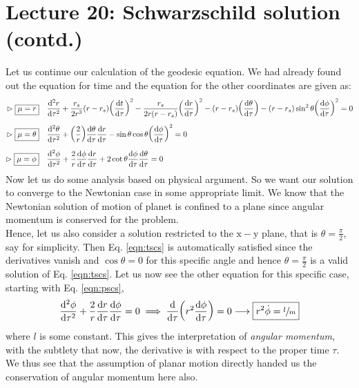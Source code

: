 \section*{Lecture 20: Schwarzschild solution (contd.)}
Let us continue our calculation of the geodesic equation. We had already found out the equation for time and the equation for the other coordinates are given as:
\begin{align}
    \vartriangleright \boxed{ \mu = r} \quad &\dv[2]{r}{\tau} + \frac{r_s}{2r^3}(r-r_s)\qty(\dv{t}{\tau})^2 - \frac{r_s}{2r(r-r_s)}\qty(\dv{r}{\tau})^2 -(r-r_s)\qty(\dv{\theta}{\tau}) - (r-r_s)\sin^2\theta\qty(\dv{\phi}{\tau})^2=0\label{eqn:rscs}\\[0.14cm]
\vartriangleright \boxed{ \mu = \theta} \quad &\dv[2]{\theta}{\tau} +\qty(\frac{2}{r})\dv{\theta}{\tau} \dv{r}{\tau}-\sin\theta\cos\theta\qty(\dv{\phi}{\tau})^2=0\label{eqn:tscs}\\[0.14cm]
  \vartriangleright \boxed{ \mu = \phi} \quad &\dv[2]{\phi}{\tau} +\frac{2}{r}\dv{\phi}{\tau}\dv{r}{\tau}+2\cot\theta \dv{\phi}{\tau}\dv{\theta}{\tau}=0\label{eqn:pscs}
\end{align}
Now let us do some analysis based on physical argument. So we want our solution to converge to the Newtonian case in some appropriate limit. We know that the Newtonian solution of motion of planet is confined to a plane since angular momentum is conserved for the problem.\\[0.15cm] Hence, let us also consider a solution restricted to the $\mathrm{x-y}$ plane, that is $\theta=\frac{\pi}{2}$, say for simplicity. Then Eq. \ref{eqn:tscs} is automatically satisfied since the derivatives vanish and $\cos\theta=0$ for this specific angle and hence $\theta=\frac{\pi}{2}$ is a valid solution of Eq. \ref{eqn:tscs}. Let us now see the other equation for this specific case, starting with Eq. \ref{eqn:pscs},
\begin{align*}
    \dv[2]{\phi}{\tau} + \frac{2}{r}\dv{r}{\tau}\dv{\phi}{\tau} = 0 \implies \dv{\tau}\qty(r^2\dv{\phi}{\tau}) = 0 \longrightarrow \boxed{r^2\dot{\phi} = \sfrac{l}{m}}
\end{align*}
where $l$ is some constant. This gives the interpretation of \textit{angular momentum}, with the subtlety that now, the derivative is with respect to the proper time $\tau$. We thus see that the assumption of planar motion directly handed us the conservation of angular momentum here also. \\[0.2cm]
